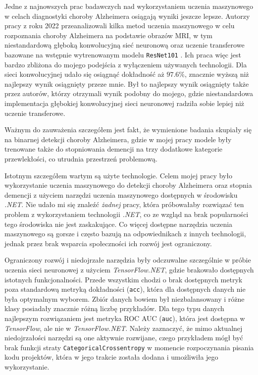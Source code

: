 Jedne z najnowszych prac badawczych nad wykorzystaniem uczenia maszynowego w celach diagnostyki choroby Alzheimera osiągają wyniki jeszcze lepsze.
Autorzy pracy z roku 2022 przeanalizowali kilka metod uczenia maszynowego w celu rozpoznania choroby Alzheimera na podstawie obrazów MRI, w tym niestandardową głęboką konwolucyjną sieć neuronową oraz uczenie transferowe bazowane na wstępnie wytrenowanym modelu \lstinline{ResNet101} \cite{mamun2022deep}.
Ich praca więc jest bardzo zbliżona do mojego podejścia z wyłączeniem używanych technologii.
Dla sieci konwolucyjnej udało się osiągnąć dokładność aż $97.6\%$, znacznie wyższą niż najlepszy wynik osiągnięty przeze mnie.
Był to najlepszy wynik osiągnięty także przez autorów, którzy otrzymali wynik podobny do mojego, gdzie niestandardowa implementacja głębokiej konwolucyjnej sieci neuronowej radziła sobie lepiej niż uczenie transferowe.

Ważnym do zauważenia szczegółem jest fakt, że wymienione badania skupiały się na binarnej detekcji choroby Alzheimera, gdzie w mojej pracy modele były trenowane także do stopniowania demencji na trzy dodatkowe kategorie przewlekłości, co utrudnia przestrzeń problemową.

Istotnym szczegółem wartym są użyte technologie.
Celem mojej pracy było wykorzystanie uczenia maszynowego do detekcji choroby Alzheimera oraz stopnia demencji z użyciem narzędzi uczenia maszynowego dostępnych w środowisku \emph{.NET}.
Nie udało mi się znaleźć \emph{żadnej} pracy, która próbowałaby rozwiązać ten problem z wykorzystaniem technologii \emph{.NET}, co ze wzgląd na brak popularności tego środowiska nie jest zaskakujące.
Co więcej dostępne narzędzia uczenia maszynowego są gorsze i często bazują na odpowiednikach z innych technologii, jednak przez brak wsparcia społeczności ich rozwój jest ograniczony.

Ograniczony rozwój i niedojrzałe narzędzia były odczuwalne szczególnie w próbie uczenia sieci neuronowej z użyciem \emph{TensorFlow.NET}, gdzie brakowało dostępnych istotnych funkcjonalności.
Przede wszystkim chodzi o brak dostępnych metryk poza standardową metryką dokładności (\lstinline{acc}), która dla dostępnych danych nie była optymalnym wyborem.
Zbiór danych bowiem był niezbalansowany i różne klasy posiadały znacznie różną liczbę przykładów.
Dla tego typu danych najlepszym rozwiązaniem jest metryka ROC AUC (\lstinline{auc}), która jest dostępna w \emph{TensorFlow}, ale nie w \emph{TensorFlow.NET}.
Należy zaznaczyć, że mimo aktualnej niedojrzałości narzędzi są one aktywnie rozwijane, czego przykładem mógł być brak funkcji straty \lstinline{CategoricalCrossentropy} w momencie rozpoczynania pisania kodu projektów, która w jego trakcie została dodana i umożliwiła jego wykorzystanie.

